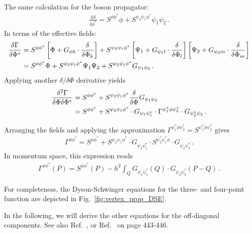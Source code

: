 The same calculation for the boson propagator:
\begin{align}
	\frac{\delta S}{\delta\phi^*} =
	S^{\phi\phi^*} \phi + S^{\psi_2\psi_1\phi^*} \psi_1 \psi_2 \,.
\end{align}
In terms of the effective fields:
\begin{align}
	\frac{\delta \Gamma}{\delta\Phi^*} &=
	S^{\phi\phi^*} \left[\Phi + G_{\phi k} \cdot
	\frac{\delta}{\delta \Phi_k} \right] + S^{\psi_2\psi_1\phi^*} \left[\Psi_1 +
	G_{\psi_1 l} \cdot \frac{\delta}{\delta \Phi_l} \right]
	\left[\Psi_2 + G_{\psi_2 m}
	\cdot \frac{\delta}{\delta \Phi_m} \right] \notag \\
	&= S^{\phi\phi^*} \Phi + S^{\psi_2\psi_1\phi^*} \Psi_1 \Psi_2
	+ S^{\psi_2\psi_1\phi^*} G_{\psi_1\psi_2} \,.
\end{align}
Applying another $\delta/\delta\Phi$ derivative yields
\begin{align}
	\frac{\delta^2\Gamma}{\delta\Phi\delta\Phi^*} &=
	S^{\phi\phi^*} + S^{\psi_2\psi_1\phi^*} \frac{\delta}{\delta\Phi}
	G_{\psi_1\psi_2} \notag \\
	&= S^{\phi\phi^*} + S^{\psi_2\psi_1\phi^*} \cdot G_{\psi_1\psi_1^*}
	\cdot \Gamma^{\psi_1^*\phi\psi_2^*} \cdot G_{\psi^*_2\psi_2} \,.
\end{align}

Arranging the fields and applying the approximation $\Gamma^{\psi_1^*\phi\psi_2^*} = S^{\psi_1^*\phi\psi_2^*}$ gives
\begin{align}
	\Gamma^{\phi\phi^*} = S^{\phi\phi^*}
	+ S^{\psi_2\psi_1\phi^*} \cdot G_{\psi_1\psi^*_1}
	\cdot S^{\psi_2^*\psi_1^*\phi} \cdot G_{\psi_2\psi^*_2} \,.
\end{align}
In momentum space, this expression reads
\begin{align}
	\Gamma^{\phi\phi^*}(P) = S^{\phi\phi^*}(P)
	- h^2 \int_Q G_{\psi_1\psi^*_1}(Q)
	\cdot G_{\psi_2\psi^*_2}(P-Q) \,.
\end{align}

For completeness, the Dyson-Schwinger equations for the three- and four-point function are depicted in Fig.~\ref{fig:vertex_prop_DSE}.

In the following, we will derive the other equations for the off-diagonal components. See also Ref.~\cite{Haussmann1999,Pieri2004-1}, or Ref.~\cite{Fetter1971} on page 443-446.\\

